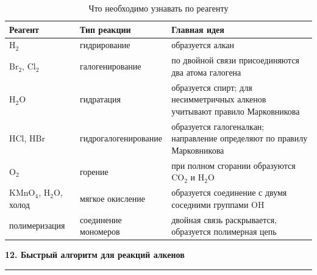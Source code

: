 \documentclass[a4paper,12pt]{article}
\newcommand{\topic}[1]{%
    \vspace{0.5em}
    {\Large\bfseries\textcolor{darkaccent}{#1}}\par
    \vspace{0.25em}
    {\color{accent}\rule{\linewidth}{0.7pt}}
    \vspace{0.4em}
}
\begin{document}
\renewcommand{\arraystretch}{1.42}
\begin{table}[ht]
\centering
\caption{Что необходимо узнавать по реагенту}
\small
\begin{tabularx}{\linewidth}{@{}lXX@{}}
\toprule
\textbf{Реагент} &
\textbf{Тип реакции} &
\textbf{Главная идея} \\
\midrule

\(\mathrm{H_2}\) &
гидрирование &
образуется алкан \\

\(\mathrm{Br_2}\), \(\mathrm{Cl_2}\) &
галогенирование &
по двойной связи присоединяются два атома галогена \\

\(\mathrm{H_2O}\) &
гидратация &
образуется спирт; для несимметричных алкенов учитывают правило Марковникова \\

\(\mathrm{HCl}\), \(\mathrm{HBr}\) &
гидрогалогенирование &
образуется галогеналкан; направление определяют по правилу Марковникова \\

\(\mathrm{O_2}\) &
горение &
при полном сгорании образуются \(\mathrm{CO_2}\) и \(\mathrm{H_2O}\) \\

\(\mathrm{KMnO_4}\), \(\mathrm{H_2O}\), холод &
мягкое окисление &
образуется соединение с двумя соседними группами \(\mathrm{OH}\) \\

полимеризация &
соединение мономеров &
двойная связь раскрывается, образуется полимерная цепь \\

\bottomrule
\end{tabularx}
\end{table}


\topic{12. Быстрый алгоритм для реакций алкенов}
\end{document}
